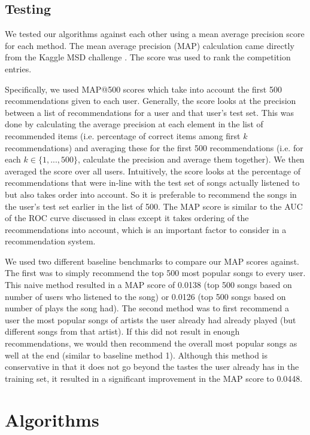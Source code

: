 \documentclass[12pt,preprint]{aastex}
\begin{document}
\subsection{Testing}
We tested our algorithms against each other using a mean average precision 
score for each method.  The mean average precision (MAP) calculation came directly from the Kaggle MSD challenge \citep{kaggleMSD}. The score was used to rank the competition entries.

Specifically, we used MAP@500 scores which take into account the first 500 recommendations given to each user. Generally, the score looks at the precision between a list of recommendations for a user and that user's test set. This was done by calculating the average precision at each element in the list of recommended items (i.e. percentage of correct items among first $k$ recommendations) and averaging these for the first 500 recommendations (i.e. for each $k \in \{1, ..., 500\}$, calculate the precision and average them together).
We then averaged the score over all users. Intuitively, the score looks at the percentage of recommendations that were in-line with the test set of songs actually listened to but also takes order into account. So it is preferable to recommend the songs in the user's test set earlier in the list of 500. The MAP score is similar to the AUC of the ROC curve discussed in class except it takes ordering of the recommendations into account, which is an important factor to consider in a recommendation system.

We used two different baseline benchmarks to compare our MAP scores against. The first was to simply recommend the top 500 most popular songs to every user. This naive method resulted in a MAP score of 0.0138 (top 500 songs based on number of users who listened to the song) or 0.0126 (top 500 songs based on number of plays the song had). The second method was to first recommend a user the most popular songs of artists the user already had already played (but different songs from that artist). If this did not result in enough recommendations, we would then recommend the overall most popular songs as well at the end (similar to baseline method 1). Although this method is conservative in that it does not go beyond the tastes the user already has in the training set, it resulted in a significant improvement in the MAP score to 0.0448.




\section{Algorithms}
\end{document}
